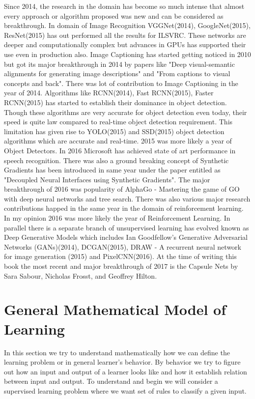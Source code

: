 \documentclass[a4paper]{article}
\begin{document}
Since 2014, the research in the domain has become so much intense that almost every approach or algorithm proposed was new and can be considered as breakthrough. In domain of Image Recognition VGGNet(2014), GoogleNet(2015), ResNet(2015) has out performed all the results for ILSVRC. These networks are deeper and computationally complex but advances in GPUs has supported their use even in production also. Image Captioning has started getting noticed in 2010 but got its major breakthrough in 2014 by papers like "Deep visual-semantic alignments for generating image descriptions" and "From captions to visual concepts and back". There was lot of contribution to Image Captioning in the year of 2014. Algorithms like RCNN(2014), Fast RCNN(2015), Faster RCNN(2015) has started to establish their dominance in object detection. Though these algorithms are very accurate for object detection even today, their speed is quite law compared to real-time object detection requirement. This limitation has given rise to YOLO(2015) and SSD(2015) object detection algorithms which are accurate and real-time. 2015 was more likely a year of Object Detectors. In 2016 Microsoft has achieved state of art performance in speech recognition. There was also a ground breaking concept of Synthetic Gradients has been introduced in same year under the paper entitled as "Decoupled Neural Interfaces using Synthetic Gradients". The major breakthrough of 2016 was popularity of AlphaGo - Mastering the game of GO with deep neural networks and tree search. There was also various major research contributions happed in the same year in the domain of reinforcement learning. In my opinion 2016 was more likely the year of Reinforcement Learning. In parallel there is a separate branch of unsupervised learning has evolved known as Deep Generative Models which includes Ian Goodfellow's Generative Adversarial Networks (GANs)(2014), DCGAN(2015), DRAW - A recurrent neural network for image generation (2015) and PixelCNN(2016). At the time of writing this book the most recent and major breakthrough of 2017 is the Capsule Nets by Sara Sabour, Nicholas Frosst, and Geoffrey Hilton.


\section{General Mathematical Model of Learning}
In this section we try to understand mathematically how we can define the learning problem or in general learner's behavior. By behavior we try to figure out how an input and output of a learner looks like and  how it establish relation between input and output. To understand and begin we will consider a supervised learning problem where we want set of rules to classify a given input. 
\end{document}
